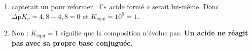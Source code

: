 \documentclass[11pt,a4paper]{article}
\begin{document}
\begin{corrige}
\begin{enumerate}[label=\alph*)]
  \item {} capterait un  pour reformer  : l'« acide formé » serait 
        lui-même. Donc $\Delta\mathrm{p}K_a = 4{,}8 - 4{,}8 = 0$ et $K_{\text{équi}} = 10^0 = 1$.
  \item Non : $K_{\text{équi}} = 1$ signifie que la composition n'évolue pas. \textbf{Un acide ne réagit pas
        avec sa propre base conjuguée.}
\end{enumerate}
\end{corrige}
\end{document}
